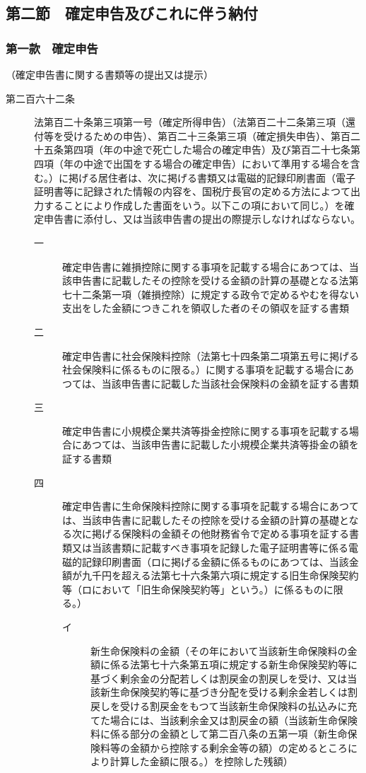 \documentclass[twocolumn,a4j,10pt]{ltjtarticle}
\begin{document}
\subsection*{第二節　確定申告及びこれに伴う納付}
\subsubsection*{第一款　確定申告}
\noindent\hspace{10pt}（確定申告書に関する書類等の提出又は提示）
\begin{description}
\item[第二百六十二条]法第百二十条第三項第一号（確定所得申告）（法第百二十二条第三項（還付等を受けるための申告）、第百二十三条第三項（確定損失申告）、第百二十五条第四項（年の中途で死亡した場合の確定申告）及び第百二十七条第四項（年の中途で出国をする場合の確定申告）において準用する場合を含む。）に掲げる居住者は、次に掲げる書類又は電磁的記録印刷書面（電子証明書等に記録された情報の内容を、国税庁長官の定める方法によつて出力することにより作成した書面をいう。以下この項において同じ。）を確定申告書に添付し、又は当該申告書の提出の際提示しなければならない。
\begin{description}
\item[一]確定申告書に雑損控除に関する事項を記載する場合にあつては、当該申告書に記載したその控除を受ける金額の計算の基礎となる法第七十二条第一項（雑損控除）に規定する政令で定めるやむを得ない支出をした金額につきこれを領収した者のその領収を証する書類
\item[二]確定申告書に社会保険料控除（法第七十四条第二項第五号に掲げる社会保険料に係るものに限る。）に関する事項を記載する場合にあつては、当該申告書に記載した当該社会保険料の金額を証する書類
\item[三]確定申告書に小規模企業共済等掛金控除に関する事項を記載する場合にあつては、当該申告書に記載した小規模企業共済等掛金の額を証する書類
\item[四]確定申告書に生命保険料控除に関する事項を記載する場合にあつては、当該申告書に記載したその控除を受ける金額の計算の基礎となる次に掲げる保険料の金額その他財務省令で定める事項を証する書類又は当該書類に記載すべき事項を記録した電子証明書等に係る電磁的記録印刷書面（ロに掲げる金額に係るものにあつては、当該金額が九千円を超える法第七十六条第六項に規定する旧生命保険契約等（ロにおいて「旧生命保険契約等」という。）に係るものに限る。）
\begin{description}
\item[イ]新生命保険料の金額（その年において当該新生命保険料の金額に係る法第七十六条第五項に規定する新生命保険契約等に基づく剰余金の分配若しくは割戻金の割戻しを受け、又は当該新生命保険契約等に基づき分配を受ける剰余金若しくは割戻しを受ける割戻金をもつて当該新生命保険料の払込みに充てた場合には、当該剰余金又は割戻金の額（当該新生命保険料に係る部分の金額として第二百八条の五第一項（新生命保険料等の金額から控除する剰余金等の額）の定めるところにより計算した金額に限る。）を控除した残額）

\end{description}
\end{description}
\end{description}
\end{document}
